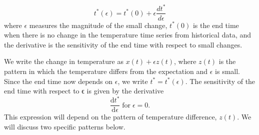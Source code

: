 \documentclass[12 pt]{article}
\begin{document}
\begin{equation}
    t^*(\epsilon) = t^*(0) + \epsilon \frac{d t^*}{d\epsilon} \tag{Eq. \theequation}
\end{equation}
where $\epsilon$ measures the magnitude of the small change, $t^*(0)$ is the end time when there is no change in the temperature time series from historical data, and the derivative is the sensitivity of the end time with respect to small changes. \par
We write the change in temperature as $x(t) + \epsilon z(t)$, where $z(t)$ is the pattern in which the temperature differs from the expectation and $\epsilon$ is small.  Since the end time now depends on $\epsilon$, we write $t^*=t^* (\epsilon)$.  The sensitivity of the end time with respect to ϵ is given by the derivative
\begin{equation}
    \frac{\mathrm{d}t^*}{\mathrm{d}\epsilon} \; \text{for} \; \epsilon = 0. \tag{Eq. \theequation}
\end{equation}
This expression will depend on the pattern of temperature difference, $z(t)$. We will discuss two specific patterns below. \par
\end{document}
